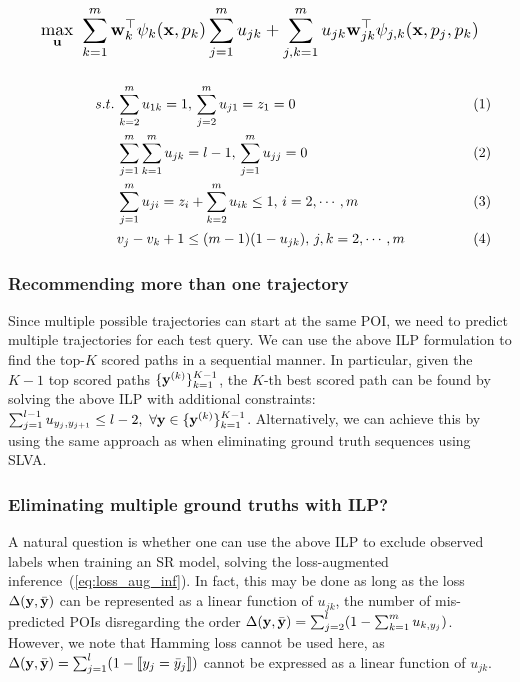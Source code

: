 \begin{equation}
\label{eq:obj}
\resizebox{0.909\linewidth}{!}{$\displaystyle
\max_{\bu} ~\sum_{k=1}^m \w_k^\top \psi_k(\x, p_k) \sum_{j=1}^m u_{jk} +
            \sum_{j,k=1}^m u_{jk} \w_{jk}^\top \psi_{j, k}(\x, p_j, p_k)
$}
\end{equation}
{$\displaystyle
\begin{minipage}{\linewidth}
\begin{alignat}{4}
s.t. \,
& \sum_{k=2}^m u_{1k} = 1, \, \sum_{j=2}^m u_{j1} = z_1=0                 \label{eq:cons1} \\
& \sum_{j=1}^m \sum_{k=1}^m u_{jk} = l-1, \, \sum_{j=1}^m u_{jj}=0        \label{eq:cons2} \\
& \sum_{j=1}^m u_{ji} = z_i + \sum_{k=2}^m u_{ik} \le 1, \, i = 2,\cdots,m  \label{eq:cons3} \\
& v_j - v_k + 1 \le (m-1) (1-u_{jk}), \, j,k = 2,\cdots,m              \label{eq:cons4}
\end{alignat}
\end{minipage}
$}



\subsubsection{Recommending more than one trajectory}
Since multiple possible trajectories can start at the same POI, 
we need to predict multiple trajectories for each test query. 
We can use the above ILP formulation to find the top-$K$ scored paths in a sequential manner.
In particular, given the $K\!-\!1$ top scored paths $\{\mathbf{y}^{({k})}\}_{k=1}^{K-1}$,
the $K\!$-th best scored path can be found by solving the above ILP with additional constraints:
$\sum_{j=1}^{l-1} u_{y_j, y_{j+1}} \le l-2, ~\forall \mathbf{y} \in \{\mathbf{y}^{(k)}\}_{k=1}^{K-1}$.
Alternatively, we can achieve this by using the same approach as when eliminating ground truth sequences using SLVA.

\subsubsection{Eliminating multiple ground truths with ILP?}
A natural question is whether one can use the above ILP
to exclude observed labels when training an SR model,
\ie solving the loss-augmented inference~(\ref{eq:loss_aug_inf}).
In fact, this may be done
as long as the loss $\Delta(\mathbf{y},\bar{\mathbf{y}})$ can be represented as a linear function of $u_{jk}$,
\eg the number of mis-predicted POIs disregarding the order $\Delta(\mathbf{y}, \bar{\mathbf{y}}) = \sum_{j=2}^l (1 - \sum_{k=1}^m u_{k, y_j})$.
However, we note that Hamming loss %
cannot be used here, as $\Delta(\mathbf{y},\bar{\mathbf{y}}) = \sum_{j=1}^l (1 - \llbracket y_j = \bar y_j \rrbracket)$
cannot be expressed as a linear function of $u_{jk}$.

